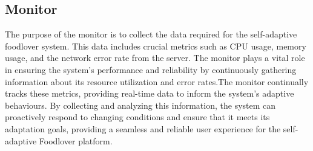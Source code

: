 \documentclass[sigconf]{acmart}
\begin{document}
\subsection{Monitor}
The purpose of the monitor is to collect the data required for the self-adaptive foodlover system. This data includes crucial metrics such as CPU usage, memory usage, and the network error rate from the server. The monitor plays a vital role in ensuring the system's performance and reliability by continuously gathering information about its resource utilization and error rates.The monitor continually tracks these metrics, providing real-time data to inform the system's adaptive behaviours. By collecting and analyzing this information, the system can proactively respond to changing conditions and ensure that it meets its adaptation goals, providing a seamless and reliable user experience for the self-adaptive Foodlover platform.
\begin{table}[H]
\end{table}
\end{document}
